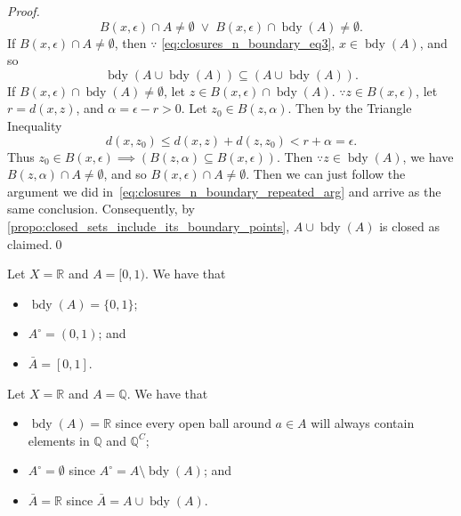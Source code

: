 \documentclass[notoc,notitlepage]{tufte-book}
\DeclareMathOperator{\bdy}{bdy }
\begin{document}
\begin{proof}
  \begin{equation*}
    B(x, \epsilon) \cap A \neq \emptyset \; \lor \; B(x, \epsilon) \cap \bdy(A) \neq \emptyset.
  \end{equation*}
  If $B(x, \epsilon) \cap A \neq \emptyset$, then $\because$ \eqref{eq:closures_n_boundary_eq3}, $x \in \bdy(A)$, and so
  \begin{equation}\tag{$\dagger$}\label{eq:closures_n_boundary_repeated_arg}
    \bdy( A \cup \bdy(A) ) \subseteq ( A \cup \bdy(A) ).
  \end{equation}
  If $B(x, \epsilon) \cap \bdy(A) \neq \emptyset$, let $z \in B(x, \epsilon) \cap \bdy(A)$. $\because z \in B(x, \epsilon)$, let $r = d(x, z)$, and $\alpha = \epsilon - r > 0$. Let $z_0 \in B(z, \alpha)$. Then by the Triangle Inequality
  \begin{equation*}
    d(x, z_0) \leq d(x, z) + d(z, z_0) < r + \alpha = \epsilon.
  \end{equation*}
  Thus $z_0 \in B(x, \epsilon) \implies ( B(z, \alpha) \subseteq B(x, \epsilon) )$. Then $\because z \in \bdy(A)$, we have $B(z, \alpha) \cap A \neq \emptyset$, and so $B(x, \epsilon) \cap A \neq \emptyset$. Then we can just follow the argument we did in~\eqref{eq:closures_n_boundary_repeated_arg} and arrive as the same conclusion. Consequently, by \cref{propo:closed_sets_include_its_boundary_points}, $A \cup \bdy(A)$ is closed as claimed.\qed\
\end{proof}

\begin{eg}
  Let $X = \mathbb{R}$ and $A = [0, 1)$. We have that
  \begin{itemize}
    \item $\bdy(A) = \{0, 1\}$;
    \item $A^\circ = (0, 1)$; and
    \item $\bar{A} = [0, 1]$.
  \end{itemize}
\end{eg}

\begin{eg}\label{eg:bdy_interior_n_closure_of_q}
  Let $X = \mathbb{R}$ and $A = \mathbb{Q}$. We have that
  \begin{itemize}
    \item $\bdy(A) = \mathbb{R}$ since every open ball around $a \in A$ will always contain elements in $\mathbb{Q}$ and ${\mathbb{Q}}^C$;
    \item $A^\circ = \emptyset$ since $A^\circ = A \setminus \bdy(A)$; and
    \item $\bar{A} = \mathbb{R}$ since $\bar{A} = A \cup \bdy(A)$.
  \end{itemize}
\end{eg}
\end{document}
